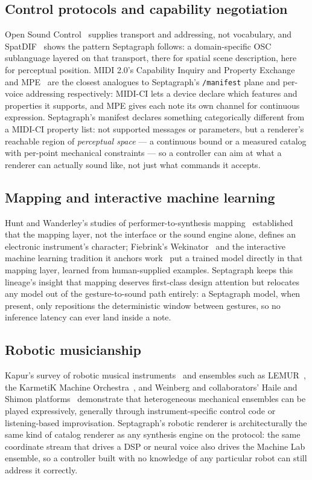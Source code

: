 \subsection{Control protocols and capability negotiation}
Open Sound Control~\cite{wrightfreed1997,wright2005} supplies transport
and addressing, not vocabulary, and SpatDIF~\cite{spatdif2013} shows the
pattern Septagraph follows: a domain-specific OSC sublanguage layered on
that transport, there for spatial scene description, here for perceptual
position. MIDI 2.0's Capability Inquiry and Property
Exchange~\cite{midici} and MPE~\cite{mpe2018} are the closest analogues to
Septagraph's \texttt{/manifest} plane and per-voice addressing
respectively: MIDI-CI lets a device declare which features and properties
it supports, and MPE gives each note its own channel for continuous
expression. Septagraph's manifest declares something categorically
different from a MIDI-CI property list: not supported messages or
parameters, but a renderer's reachable region of \emph{perceptual space}
--- a continuous bound or a measured catalog with per-point mechanical
constraints --- so a controller can aim at what a renderer can actually
sound like, not just what commands it accepts.

\subsection{Mapping and interactive machine learning}
Hunt and Wanderley's studies of performer-to-synthesis
mapping~\cite{huntwanderley2002,huntwanderleyparadis2003} established that
the mapping layer, not the interface or the sound engine alone, defines an
electronic instrument's character; Fiebrink's
Wekinator~\cite{fiebrink2009wekinator,fiebrink2011thesis} and the
interactive machine learning tradition it anchors
work~\cite{fiebrinkcaramiaux2018,caramiauxtanaka2013,francoise2014} put a
trained model directly in that mapping layer, learned from human-supplied
examples. Septagraph keeps this lineage's insight that mapping deserves
first-class design attention but relocates any model out of the
gesture-to-sound path entirely: a Septagraph model, when present, only
repositions the deterministic window between gestures, so no inference
latency can ever land inside a note.

\subsection{Robotic musicianship}
Kapur's survey of robotic musical instruments~\cite{kapur2005history} and
ensembles such as LEMUR~\cite{singer2004lemur}, the KarmetiK Machine
Orchestra~\cite{kapur2011machineorchestra}, and Weinberg and
collaborators' Haile and Shimon
platforms~\cite{weinbergdriscoll2006,hoffmanweinberg2010} demonstrate that
heterogeneous mechanical ensembles can be played expressively, generally
through instrument-specific control code or listening-based
improvisation. Septagraph's robotic renderer is architecturally the same
kind of catalog renderer as any synthesis engine on the protocol: the
same coordinate stream that drives a DSP or neural voice also drives the
Machine Lab ensemble, so a controller built with no knowledge of any
particular robot can still address it correctly.

